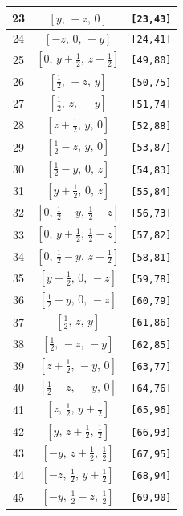 \documentclass[fleqn,8pt]{jsarticle}
\begin{document}
\begin{longtable}{ccc}
23 & $\left[ y,\, - z,\, 0 \right]$ & {\tt [23,43]} \\ \hline
24 & $\left[ - z,\, 0,\, - y \right]$ & {\tt [24,41]} \\ \hline
25 & $\left[ 0,\, y + \frac{1}{2},\, z + \frac{1}{2} \right]$ & {\tt [49,80]} \\ \hline
26 & $\left[ \frac{1}{2},\, - z,\, y \right]$ & {\tt [50,75]} \\ \hline
27 & $\left[ \frac{1}{2},\, z,\, - y \right]$ & {\tt [51,74]} \\ \hline
28 & $\left[ z + \frac{1}{2},\, y,\, 0 \right]$ & {\tt [52,88]} \\ \hline
29 & $\left[ \frac{1}{2} - z,\, y,\, 0 \right]$ & {\tt [53,87]} \\ \hline
30 & $\left[ \frac{1}{2} - y,\, 0,\, z \right]$ & {\tt [54,83]} \\ \hline
31 & $\left[ y + \frac{1}{2},\, 0,\, z \right]$ & {\tt [55,84]} \\ \hline
32 & $\left[ 0,\, \frac{1}{2} - y,\, \frac{1}{2} - z \right]$ & {\tt [56,73]} \\ \hline
33 & $\left[ 0,\, y + \frac{1}{2},\, \frac{1}{2} - z \right]$ & {\tt [57,82]} \\ \hline
34 & $\left[ 0,\, \frac{1}{2} - y,\, z + \frac{1}{2} \right]$ & {\tt [58,81]} \\ \hline
35 & $\left[ y + \frac{1}{2},\, 0,\, - z \right]$ & {\tt [59,78]} \\ \hline
36 & $\left[ \frac{1}{2} - y,\, 0,\, - z \right]$ & {\tt [60,79]} \\ \hline
37 & $\left[ \frac{1}{2},\, z,\, y \right]$ & {\tt [61,86]} \\ \hline
38 & $\left[ \frac{1}{2},\, - z,\, - y \right]$ & {\tt [62,85]} \\ \hline
39 & $\left[ z + \frac{1}{2},\, - y,\, 0 \right]$ & {\tt [63,77]} \\ \hline
40 & $\left[ \frac{1}{2} - z,\, - y,\, 0 \right]$ & {\tt [64,76]} \\ \hline
41 & $\left[ z,\, \frac{1}{2},\, y + \frac{1}{2} \right]$ & {\tt [65,96]} \\ \hline
42 & $\left[ y,\, z + \frac{1}{2},\, \frac{1}{2} \right]$ & {\tt [66,93]} \\ \hline
43 & $\left[ - y,\, z + \frac{1}{2},\, \frac{1}{2} \right]$ & {\tt [67,95]} \\ \hline
44 & $\left[ - z,\, \frac{1}{2},\, y + \frac{1}{2} \right]$ & {\tt [68,94]} \\ \hline
45 & $\left[ - y,\, \frac{1}{2} - z,\, \frac{1}{2} \right]$ & {\tt [69,90]} \\ \hline

\end{longtable}
\end{document}
